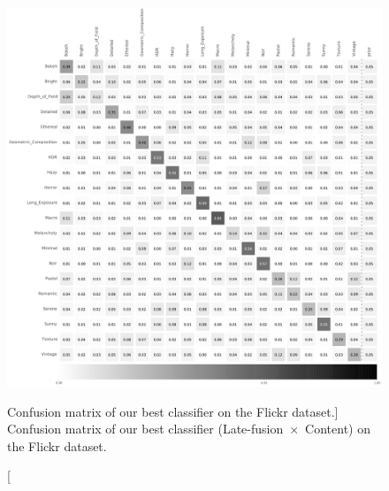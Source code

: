 \begin{figure}[ht!]
\centering
\includegraphics[width=1\linewidth]{../style/figures/evaluation/flickr_conf.pdf}
\caption
[Confusion matrix of our best classifier on the Flickr dataset.]
{Confusion matrix of our best classifier (\mbox{Late-fusion $\times$ Content}) on the Flickr dataset.}
\label{fig:flickr_conf}
\end{figure}

